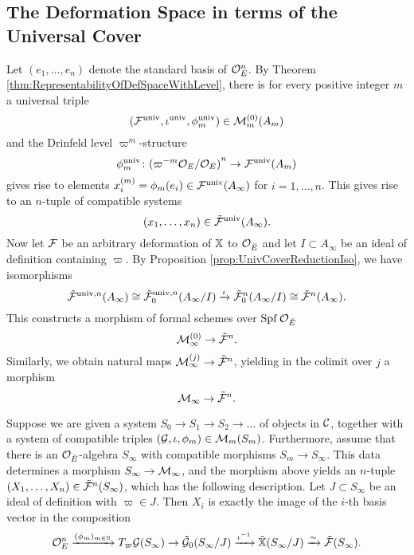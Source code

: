 \documentclass[../main.tex]{subfiles}
\begin{document}
\subsection{The Deformation Space in terms of the Universal Cover} %
\label{ssub:Relation to the Deformation Space at Infinite Level}
Let $(e_1, \dots, e_n)$ denote the standard basis of $\mathcal{O}_E^n$. By 
Theorem \ref{thm:RepresentabilityOfDefSpaceWithLevel}, there is for 
every positive integer $m$ a universal triple 
$$(\mathcal{F}^{\mathrm{univ}}, \iota^{{\mathrm{univ}}}, \phi^{\mathrm{univ}}_m) \in \mathcal{M}_{m}^{(0)}(A_m)$$
and the Drinfeld level $\varpi^m$-structure 
\begin{equation*}
  \phi_m^{\mathrm{univ}}\colon {(\varpi^{-m}\mathcal{O}_{E}/\mathcal{O}_E)}^n \to \mathcal{F}^{\mathrm{univ}}(A_m)
\end{equation*}
gives rise to elements $x_i^{(m)} = \phi_m(e_i) \in
\mathcal{F}^{{\mathrm{univ}}}(A_\infty)$ for $i = 1, \dots, n$. 
This gives rise to an $n$-tuple 
of compatible systems
\begin{equation*}
  (x_1, \dots, x_n) \in \tilde {\mathcal{F}}^{\mathrm{univ}} (A_\infty). 
\end{equation*}
Now let $\mathcal{F}$ be an arbitrary deformation of $\mathbb{X}$ to $\mathcal{O}_{{\breve {E}}}$ and let $I \subset A_\infty$ be an ideal of definition
containing $\varpi$. By 
Proposition \ref{prop:UnivCoverReductionIso}, we have isomorphisms
\begin{equation*}
  \tilde {\mathcal{F}}^{{\mathrm{univ}},n}(A_\infty) \cong \tilde {\mathcal{F}}_0^{{\mathrm{univ}}, n}(A_\infty/I)
  \xrightarrow{\iota} \tilde {\mathcal{F}}_0^n(A_\infty/I)
  \cong \tilde {\mathcal{F}}^n(A_\infty).
\end{equation*}
This constructs a morphism of formal schemes over $\operatorname{Spf} \mathcal{O}_{\breve {E}}$
\begin{equation*} 
  \mathcal{M}_\infty^{(0)} \to \tilde {\mathcal{F}}^n.
\end{equation*}
Similarly, we obtain natural maps $\mathcal{M}_\infty^{(j)} \to \tilde {\mathcal{F}}^n$, yielding in the colimit over $j$ a morphism
\begin{equation}\label{eq:MapFromMtoTildeF}
\mathcal{M}_\infty \to \tilde {\mathcal{F}}^n.
\end{equation}

Suppose we are given a system $S_0 \to S_1 \to S_2 \to \dots$ of objects in 
$\mathcal{C}$, together with a system of compatible triples 
$(\mathcal{G}, \iota, \phi_m) \in \mathcal{M}_m(S_m)$. Furthermore, assume that there
is an $\mathcal{O}_{\breve {E}}$-algebra 
$S_\infty$ with compatible morphisms $S_m \to S_\infty$. This data determines a 
morphism $S_\infty \to \mathcal{M}_\infty$, and the morphism above yields an $n$-tuple 
$(X_1, \dots, X_n) \in \tilde {\mathcal{F}}^n(S_\infty)$, which has the following description. Let $J \subset S_\infty$
be an ideal of definition with $\varpi \in J$. Then $X_i$ is exactly the image
of the $i$-th basis vector in the composition
\begin{equation*}
    {\mathcal{O}_E^n} \xrightarrow{(\phi_m)_{m \in \mathbb{N}}} T_\varpi \mathcal{G}(S_\infty) \to \tilde {\mathcal{G}}_0(S_\infty/J) \xrightarrow{\iota^{-1}} \tilde {\mathbb{X}}(S_\infty/J)
    \xrightarrow{\sim} \tilde {\mathcal{F}}(S_\infty).
\end{equation*}
\end{document}
